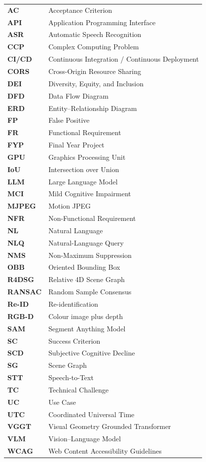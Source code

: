 \noindent
\begin{tabularx}{\textwidth}{@{}>{\bfseries}l Y@{}}
AC    & Acceptance Criterion\\
API   & Application Programming Interface\\
ASR   & Automatic Speech Recognition\\
CCP   & Complex Computing Problem\\
CI/CD & Continuous Integration / Continuous Deployment\\
CORS  & Cross-Origin Resource Sharing\\
DEI   & Diversity, Equity, and Inclusion\\
DFD   & Data Flow Diagram\\
ERD   & Entity--Relationship Diagram\\
FP    & False Positive\\
FR    & Functional Requirement\\
FYP   & Final Year Project\\
GPU   & Graphics Processing Unit\\
IoU   & Intersection over Union\\
LLM   & Large Language Model\\
MCI   & Mild Cognitive Impairment\\
MJPEG & Motion JPEG\\
NFR   & Non-Functional Requirement\\
NL    & Natural Language\\
NLQ   & Natural-Language Query\\
NMS   & Non-Maximum Suppression\\
OBB   & Oriented Bounding Box\\
R4DSG & Relative 4D Scene Graph\\
RANSAC & Random Sample Consensus\\
Re-ID & Re-identification\\
RGB-D & Colour image plus depth\\
SAM   & Segment Anything Model\\
SC    & Success Criterion\\
SCD   & Subjective Cognitive Decline\\
SG    & Scene Graph\\
STT   & Speech-to-Text\\
TC    & Technical Challenge\\
UC    & Use Case\\
UTC   & Coordinated Universal Time\\
VGGT  & Visual Geometry Grounded Transformer\\
VLM   & Vision--Language Model\\
WCAG  & Web Content Accessibility Guidelines\\
\end{tabularx}
